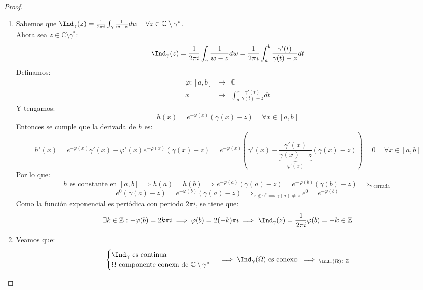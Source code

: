 \begin{proof}
\begin{enumerate}
\[        \]
        Así, finalmente, tenemos que:
        \[
        \left| \Ind_\gamma(z) - \Ind_\gamma(z_1) \right| \leq
        \frac{\Long (\Gamma)}{\pi \delta^2} |z - z_1| \xrightarrow{z \to z_1} 0 \quad \forall z \in D(z_1, \delta/2)
        \]
        \item Sabemos que $\Ind_\gamma (z) = \frac{1}{2 \pi i } \int_\gamma \frac{1}{w - z} dw \, \quad \forall z \in \mathbb{C} \setminus \gamma^*$.\\
        Ahora sea $z \in \mathbb{C} \setminus \gamma^*$:
        \[
        \Ind_\gamma(z) = \frac{1}{2 \pi i} \int_\gamma \frac{1}{w - z} dw =
        \frac{1}{2 \pi i} \int_a^b \frac{\gamma'(t)}{\gamma(t) - z} dt
        \]
        Definamos:
        \[
        \begin{array}{ccc}
            \varphi : [a,b] & \to & \mathbb{C} \\
            x & \mapsto & \int_a^x \frac{\gamma'(t)}{\gamma(t) - z} dt
        \end{array}
        \]
        Y tengamos:
        \[
        h(x) = e^{-\varphi(x)} (\gamma(x) - z) \, \quad \forall x \in [a,b]
        \]
        Entonces se cumple que la derivada de $h$ es:
        \[
        h'(x) = 
        e^{-\varphi(x)} \gamma'(x) - \varphi'(x) e^{-\varphi(x)} (\gamma(x) - z) =
        e^{-\varphi(x)} \left( \gamma'(x) - \underbrace{\frac{\gamma'(x)}{\gamma(x) - z}}_{\varphi'(x)} (\gamma(x) - z) \right) =
        0 \, \quad \forall x \in [a,b]
        \]
        Por lo que:
        \[
        h \text{ es constante en } [a,b] \implies 
        h(a) = h(b) \implies 
        e^{-\varphi(a)} (\gamma(a) - z) = e^{-\varphi(b)} (\gamma(b) - z) \implies_{\gamma \text{ cerrada}}
        \]
        \[
        e^0 (\gamma(a) - z) = 
        e^{-\varphi(b)} (\gamma(a) - z) \implies_{z \notin \gamma^* \implies \gamma(a) \neq z} e^{0} = e^{- \varphi(b)}
        \]
        Como la función exponencial es periódica con periodo $2 \pi i$, se tiene que:
        \[
        \exists k \in \mathbb{Z} : - \varphi (b) =
        2k\pi i \implies
        \varphi (b) = 2(-k) \pi i \implies
        \Ind_\gamma (z) = \frac{1}{2 \pi i} \varphi (b) = -k \in \mathbb{Z}
        \]
        \item Veamos que:
        \[
        \begin{cases}
            \Ind_\gamma \text{ es continua} \\
            \Omega \text{ componente conexa de } \mathbb{C} \setminus \gamma^*
        \end{cases} \implies
        \Ind_\gamma (\Omega) \text{ es conexo } \implies_{\Ind_\gamma (\Omega) \subset \mathbb{Z}}
\]
\end{enumerate}
\end{proof}
